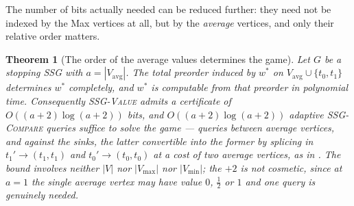 \documentclass[11pt]{article}
\theoremstyle{plain}
\newtheorem{theorem}{Theorem}[section]
\theoremstyle{definition}
\newcommand{\Vmax}{V_{\max}}
\newcommand{\Vmin}{V_{\min}}
\newcommand{\Vavg}{V_{\mathrm{avg}}}
\begin{document}
The number of bits actually needed can be reduced further: they need not
be indexed by the Max vertices at all, but by the \emph{average} vertices,
and only their relative order matters.

\begin{theorem}[The order of the average values determines the game]\label{thm:order-determines}
Let $G$ be a stopping SSG with $a=|\Vavg|$. The total preorder induced by
$w^\ast$ on $\Vavg\cup\{t_0,t_1\}$ determines $w^\ast$ completely, and
$w^\ast$ is computable from that preorder in polynomial time.
Consequently \textsc{SSG-Value} admits a certificate of
$O((a+2)\log(a+2))$ bits, and $O((a+2)\log(a+2))$ adaptive
\textsc{SSG-Compare} queries suffice to solve the game --- queries between
average vertices, and against the sinks, the latter convertible into the
former by splicing in $t_1'\to(t_1,t_1)$ and $t_0'\to(t_0,t_0)$ at a cost
of two average vertices, as in . The bound involves
neither $|V|$ nor $|\Vmax|$ nor $|\Vmin|$; the $+2$ is not cosmetic, since
at $a=1$ the single average vertex may have value $0$, $\tfrac12$ or $1$
and one query is genuinely needed.
\end{theorem}
\end{document}
